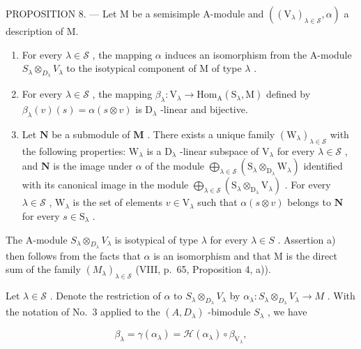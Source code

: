 PROPOSITION 8. --- Let M be a semisimple A-module and \(((\mathrm{V}_{\lambda})_{\lambda \in \mathcal{S}}, \alpha)\) a description of M.

\begin{enumerate}
\def\labelenumi{\alph{enumi})}
\item
  For every \(\lambda \in \mathcal{S}\) , the mapping \(\alpha\) induces an isomorphism from the A-module \(S_{\lambda} \otimes_{D_{\lambda}} V_{\lambda}\) to the isotypical component of M of type \(\lambda\) .
\item
  For every \(\lambda \in \mathcal{S}\) , the mapping \(\beta_{\lambda} : \mathrm{V}_{\lambda} \to \mathrm{Hom}_{\mathrm{A}}(\mathrm{S}_{\lambda}, \mathrm{M})\) defined by \(\beta_{\lambda}(v)(s) = \alpha(s \otimes v)\) is \(\mathrm{D}_{\lambda}\) -linear and bijective.
\item
  Let \(\mathbf{N}\) be a submodule of \(\mathbf{M}\) . There exists a unique family \((\mathrm{W}_{\lambda})_{\lambda \in \mathcal{S}}\) with the following properties: \(\mathrm{W}_{\lambda}\) is a \(\mathrm{D}_{\lambda}\) -linear subspace of \(\mathrm{V}_{\lambda}\) for every \(\lambda \in \mathcal{S}\) , and \(\mathbf{N}\) is the image under \(\alpha\) of the module \(\bigoplus_{\lambda \in \mathcal{S}} (\mathrm{S}_{\lambda} \otimes_{\mathrm{D}_{\lambda}} \mathrm{W}_{\lambda})\) identified with its canonical image in the module \(\bigoplus_{\lambda \in \mathcal{S}} (\mathrm{S}_{\lambda} \otimes_{\mathrm{D}_{\lambda}} \mathrm{V}_{\lambda})\) . For every \(\lambda \in \mathcal{S}\) , \(\mathrm{W}_{\lambda}\) is the set of elements \(v \in \mathrm{V}_{\lambda}\) such that \(\alpha(s \otimes v)\) belongs to \(\mathbf{N}\) for every \(s \in \mathrm{S}_{\lambda}\) .
\end{enumerate}

The A-module \(S_{\lambda} \otimes_{D_{\lambda}} V_{\lambda}\) is isotypical of type \(\lambda\) for every \(\lambda \in S\) . Assertion a) then follows from the facts that \(\alpha\) is an isomorphism and that M is the direct sum of the family \((M_{\lambda})_{\lambda \in \mathcal{S}}\) (VIII, p.~65, Proposition 4, a)).

Let \(\lambda \in \mathcal{S}\) . Denote the restriction of \(\alpha\) to \(S_{\lambda} \otimes_{D_{\lambda}} V_{\lambda}\) by \(\alpha_{\lambda}: S_{\lambda} \otimes_{D_{\lambda}} V_{\lambda} \to M\) . With the notation of No.~3 applied to the \((A, D_{\lambda})\) -bimodule \(S_{\lambda}\) , we have

\[
\beta_ {\lambda} = \gamma (\alpha_ {\lambda}) = \mathcal {H} (\alpha_ {\lambda}) \circ \beta_ {\mathrm{V} _ {\lambda}},
\]

